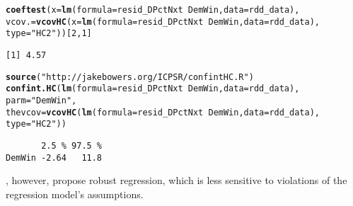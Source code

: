 \documentclass[11pt,leqno]{article}\usepackage[]{graphicx}\usepackage[]{color}
\makeatletter
\newcommand{\hlnum}[1]{\textcolor[rgb]{0.686,0.059,0.569}{#1}}%
\newcommand{\hlstr}[1]{\textcolor[rgb]{0.192,0.494,0.8}{#1}}%
\newcommand{\hlopt}[1]{\textcolor[rgb]{0,0,0}{#1}}%
\newcommand{\hlstd}[1]{\textcolor[rgb]{0.345,0.345,0.345}{#1}}%
\newcommand{\hlkwc}[1]{\textcolor[rgb]{0.333,0.667,0.333}{#1}}%
\newcommand{\hlkwd}[1]{\textcolor[rgb]{0.737,0.353,0.396}{\textbf{#1}}}%
\newenvironment{kframe}{%
 \def\at@end@of@kframe{}%
 \ifinner\ifhmode%
  \def\at@end@of@kframe{\end{minipage}}%
  \begin{minipage}{\columnwidth}%
 \fi\fi%
 \def\FrameCommand##1{\hskip\@totalleftmargin \hskip-\fboxsep
 \colorbox{shadecolor}{##1}\hskip-\fboxsep
     \hskip-\linewidth \hskip-\@totalleftmargin \hskip\columnwidth}%
 \MakeFramed {\advance\hsize-\width
   \@totalleftmargin\z@ \linewidth\hsize
   \@setminipage}}%
 {\par\unskip\endMakeFramed%
 \at@end@of@kframe}
\newenvironment{knitrout}{}{} %
\theoremstyle{newstyle}
\makeatother
\begin{document}
\begin{knitrout}\footnotesize
{}\color{fgcolor}\begin{kframe}
\begin{alltt}
\hlkwd{coeftest}\hlstd{(}\hlkwc{x} \hlstd{=} \hlkwd{lm}\hlstd{(}\hlkwc{formula} \hlstd{= resid_DPctNxt} \hlopt{~} \hlstd{DemWin,} \hlkwc{data} \hlstd{= rdd_data),}
         \hlkwc{vcov.} \hlstd{=} \hlkwd{vcovHC}\hlstd{(}\hlkwc{x} \hlstd{=} \hlkwd{lm}\hlstd{(}\hlkwc{formula} \hlstd{= resid_DPctNxt} \hlopt{~} \hlstd{DemWin,} \hlkwc{data} \hlstd{= rdd_data),}
                        \hlkwc{type} \hlstd{=} \hlstr{"HC2"}\hlstd{))[}\hlnum{2}\hlstd{,}\hlnum{1}\hlstd{]}
\end{alltt}
\begin{verbatim}
[1] 4.57
\end{verbatim}
\begin{alltt}
\hlkwd{source}\hlstd{(}\hlstr{"http://jakebowers.org/ICPSR/confintHC.R"}\hlstd{)}
\hlkwd{confint.HC}\hlstd{(}\hlkwd{lm}\hlstd{(}\hlkwc{formula} \hlstd{= resid_DPctNxt} \hlopt{~} \hlstd{DemWin,} \hlkwc{data} \hlstd{= rdd_data),}
           \hlkwc{parm} \hlstd{=} \hlstr{"DemWin"}\hlstd{,}
           \hlkwc{thevcov} \hlstd{=} \hlkwd{vcovHC}\hlstd{(}\hlkwd{lm}\hlstd{(}\hlkwc{formula} \hlstd{= resid_DPctNxt} \hlopt{~} \hlstd{DemWin,} \hlkwc{data} \hlstd{= rdd_data),}
                            \hlkwc{type}\hlstd{=}\hlstr{"HC2"}\hlstd{))}
\end{alltt}
\begin{verbatim}
       2.5 % 97.5 %
DemWin -2.64   11.8
\end{verbatim}
\end{kframe}
\end{knitrout}

\citet{saleshansen2018}, however, propose robust regression, which is less sensitive to violations of the regression model's assumptions.
\end{document}
